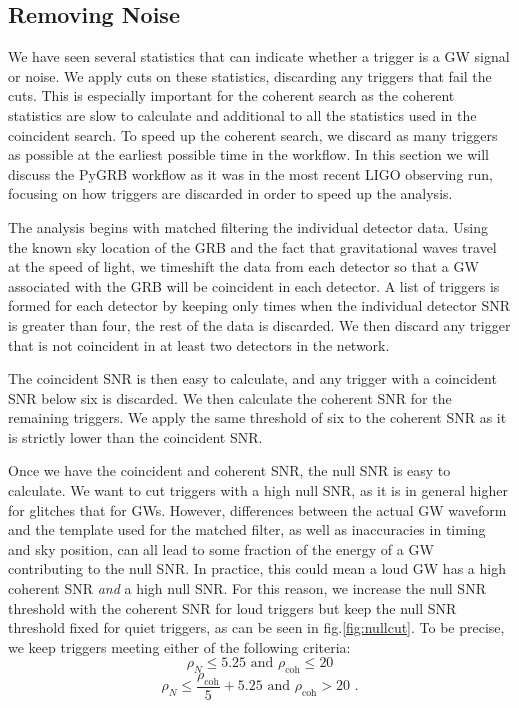 \documentclass[11pt]{cuthesis}
\newcommand{\fs}{\text{ .}}
\begin{document}
\subsection{Removing Noise} \label{sec:thresholds}
We have seen several statistics that can indicate whether a trigger is a GW signal or noise. We apply cuts on these statistics, discarding any triggers that fail the cuts. This is especially important for the coherent search as the coherent statistics are slow to calculate and additional to all the statistics used in the coincident search. To speed up the coherent search, we discard as many triggers as possible at the earliest possible time in the workflow. In this section we will discuss the PyGRB workflow as it was in the most recent LIGO observing run, focusing on how triggers are discarded in order to speed up the analysis.

The analysis begins with matched filtering the individual detector data. Using the known sky location of the GRB and the fact that gravitational waves travel at the speed of light, we timeshift the data from each detector so that a GW associated with the GRB will be coincident in each detector. A list of triggers is formed for each detector by keeping only times when the individual detector SNR is greater than four, the rest of the data is discarded. We then discard any trigger that is not coincident in at least two detectors in the network. 

The coincident SNR is then easy to calculate, and any trigger with a coincident SNR below six is discarded. We then calculate the coherent SNR for the remaining triggers. We apply the same threshold of six to the coherent SNR as it is strictly lower than the coincident SNR. 

Once we have the coincident and coherent SNR, the null SNR is easy to calculate. We want to cut triggers with a high null SNR, as it is in general higher for glitches that for GWs. However, differences between the actual GW waveform and the template used for the matched filter, as well as inaccuracies in timing and sky position, can all lead to some fraction of the energy of a GW contributing to the null SNR. In practice, this could mean a loud GW has a high coherent SNR \textit{and} a high null SNR. For this reason, we increase the null SNR threshold with the coherent SNR for loud triggers but keep the null SNR threshold fixed for quiet triggers, as can be seen in fig.\ref{fig:nullcut}. To be precise, we keep triggers meeting either of the following criteria: 
\begin{equation}
\rho_N\leq5.25 \text{  and   } \rho_\text{coh}\leq 20
\end{equation} 
\begin{equation}
\rho_N \leq \frac{\rho_\text{coh}}{5}+5.25  \text{  and   } \rho_\text{coh}> 20 \fs
\end{equation}
\end{document}
